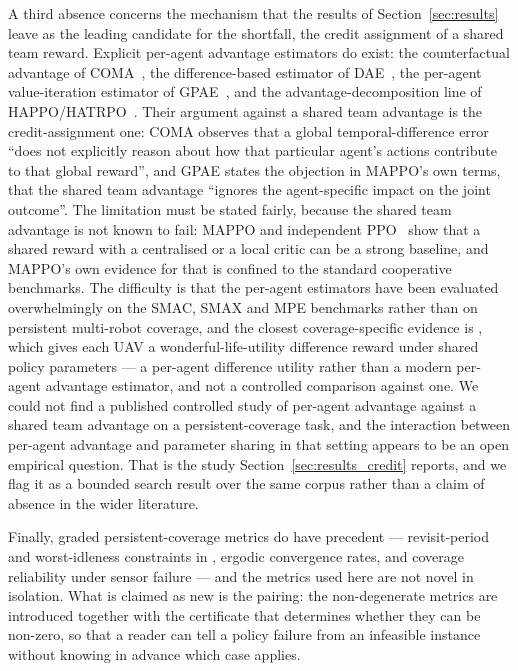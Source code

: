 \documentclass[conference]{IEEEtran}
\begin{document}
A third absence concerns the mechanism that the results of Section~\ref{sec:results} leave as the leading candidate for the shortfall, the credit assignment of a shared team reward. Explicit per-agent advantage estimators do exist: the counterfactual advantage of COMA~\cite{foerster2018}, the difference-based estimator of DAE~\cite{li2022}, the per-agent value-iteration estimator of GPAE~\cite{kim2026}, and the advantage-decomposition line of HAPPO/HATRPO~\cite{kuba2022}. Their argument against a shared team advantage is the credit-assignment one: COMA observes that a global temporal-difference error ``does not explicitly reason about how that particular agent's actions contribute to that global reward'', and GPAE states the objection in MAPPO's own terms, that the shared team advantage ``ignores the agent-specific impact on the joint outcome''. The limitation must be stated fairly, because the shared team advantage is not known to fail: MAPPO and independent PPO~\cite{dewitt2021} show that a shared reward with a centralised or a local critic can be a strong baseline, and MAPPO's own evidence for that is confined to the standard cooperative benchmarks. The difficulty is that the per-agent estimators have been evaluated overwhelmingly on the SMAC, SMAX and MPE benchmarks rather than on persistent multi-robot coverage, and the closest coverage-specific evidence is \cite{sun2023}, which gives each UAV a wonderful-life-utility difference reward under shared policy parameters --- a per-agent difference utility rather than a modern per-agent advantage estimator, and not a controlled comparison against one. We could not find a published controlled study of per-agent advantage against a shared team advantage on a persistent-coverage task, and the interaction between per-agent advantage and parameter sharing in that setting appears to be an open empirical question. That is the study Section~\ref{sec:results_credit} reports, and we flag it as a bounded search result over the same corpus rather than a claim of absence in the wider literature.

Finally, graded persistent-coverage metrics do have precedent --- revisit-period and worst-idleness constraints in \cite{wang2026}, ergodic convergence rates, and coverage reliability under sensor failure --- and the metrics used here are not novel in isolation. What is claimed as new is the pairing: the non-degenerate metrics are introduced together with the certificate that determines whether they can be non-zero, so that a reader can tell a policy failure from an infeasible instance without knowing in advance which case applies.
\end{document}
